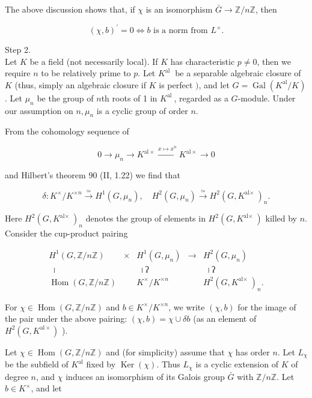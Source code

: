 \documentclass[10pt]{article}
\begin{document}
The above discussion shows that, if $\chi$ is an isomorphism $\bar{G} \rightarrow \mathbb{Z} / n \mathbb{Z}$, then

$$
(\chi, b)^{\prime}=0 \Longleftrightarrow b \text { is a norm from } L^{\times} .
$$

Step 2.\\
Let $K$ be a field (not necessarily local). If $K$ has characteristic $p \neq 0$, then we require $n$ to be relatively prime to $p$. Let $K^{\text {al }}$ be a separable algebraic closure of $K$ (thus, simply an algebraic closure if $K$ is perfect $)$, and let $G=\operatorname{Gal}\left(K^{\mathrm{al}} / K\right)$. Let $\mu_{n}$ be the group of $n$th roots of 1 in $K^{\text {al }}$, regarded as a $G$-module. Under our assumption on $n, \mu_{n}$ is a cyclic group of order $n$.

From the cohomology sequence of

$$
0 \longrightarrow \mu_{n} \longrightarrow K^{\mathrm{al} \times} \xrightarrow{x \mapsto x^{n}} K^{\mathrm{al} \times} \longrightarrow 0
$$

and Hilbert's theorem 90 (II, 1.22) we find that

$$
\delta: K^{\times} / K^{\times n} \xrightarrow{\simeq} H^{1}\left(G, \mu_{n}\right), \quad H^{2}\left(G, \mu_{n}\right) \xrightarrow{\simeq} H^{2}\left(G, K^{\text {al× }}\right)_{n} .
$$

Here $H^{2}\left(G, K^{\text {al× }}\right)_{n}$ denotes the group of elements in $H^{2}\left(G, K^{\text {al× }}\right)$ killed by $n$.\\
Consider the cup-product pairing

$$
\begin{array}{ccccc}
H^{1}(G, \mathbb{Z} / n \mathbb{Z}) & \times & H^{1}\left(G, \mu_{n}\right) & \rightarrow & H^{2}\left(G, \mu_{n}\right) \\
\text { । } & & \text { ।ʔ } & & \text { ।ʔ } \\
\operatorname{Hom}(G, \mathbb{Z} / n \mathbb{Z}) & & K^{\times} / K^{\times n} & & H^{2}\left(G, K^{\text {al× }}\right)_{n} .
\end{array}
$$

For $\chi \in \operatorname{Hom}(G, \mathbb{Z} / n \mathbb{Z})$ and $b \in K^{\times} / K^{\times n}$, we write $(\chi, b)$ for the image of the pair under the above pairing: $(\chi, b)=\chi \cup \delta b$ (as an element of $H^{2}\left(G, K^{\mathrm{al} \times}\right)$ ).

Let $\chi \in \operatorname{Hom}(G, \mathbb{Z} / n \mathbb{Z})$ and (for simplicity) assume that $\chi$ has order $n$. Let $L_{\chi}$ be the subfield of $K^{\mathrm{al}}$ fixed by $\operatorname{Ker}(\chi)$. Thus $L_{\chi}$ is a cyclic extension of $K$ of degree $n$, and $\chi$ induces an isomorphism of its Galois group $\bar{G}$ with $\mathbb{Z} / n \mathbb{Z}$. Let $b \in K^{\times}$, and let
\end{document}
